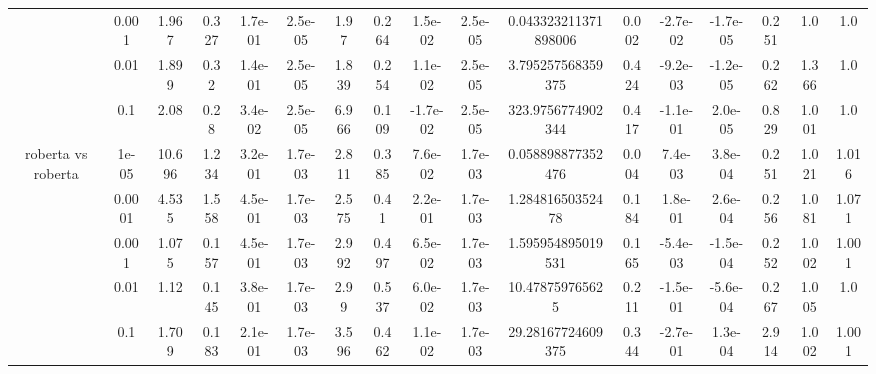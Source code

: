 \begin{tabular}{|c|c|c|c|c|c|c|c|c|c|c|c|c|c|c|c|c|}
 & 0.001 & 1.967 & 0.327 & 1.7e-01 & 2.5e-05 & 1.97 & 0.264 & 1.5e-02 & 2.5e-05 & 0.043323211371898006 & 0.002 & -2.7e-02 & -1.7e-05 & 0.251 & 1.0 & 1.0 \\
 & 0.01 & 1.899 & 0.32 & 1.4e-01 & 2.5e-05 & 1.839 & 0.254 & 1.1e-02 & 2.5e-05 & 3.795257568359375 & 0.424 & -9.2e-03 & -1.2e-05 & 0.262 & 1.366 & 1.0 \\
 & 0.1 & 2.08 & 0.28 & 3.4e-02 & 2.5e-05 & 6.966 & 0.109 & -1.7e-02 & 2.5e-05 & 323.9756774902344 & 0.417 & -1.1e-01 & 2.0e-05 & 0.829 & 1.001 & 1.0 \\
\hline
\multirow{5}{*}{roberta  vs roberta } & 1e-05 & 10.696 & 1.234 & 3.2e-01 & 1.7e-03 & 2.811 & 0.385 & 7.6e-02 & 1.7e-03 & 0.058898877352476 & 0.004 & 7.4e-03 & 3.8e-04 & 0.251 & 1.021 & 1.016 \\
 & 0.0001 & 4.535 & 1.558 & 4.5e-01 & 1.7e-03 & 2.575 & 0.41 & 2.2e-01 & 1.7e-03 & 1.28481650352478 & 0.184 & 1.8e-01 & 2.6e-04 & 0.256 & 1.081 & 1.071 \\
 & 0.001 & 1.075 & 0.157 & 4.5e-01 & 1.7e-03 & 2.992 & 0.497 & 6.5e-02 & 1.7e-03 & 1.595954895019531 & 0.165 & -5.4e-03 & -1.5e-04 & 0.252 & 1.002 & 1.001 \\
 & 0.01 & 1.12 & 0.145 & 3.8e-01 & 1.7e-03 & 2.99 & 0.537 & 6.0e-02 & 1.7e-03 & 10.478759765625 & 0.211 & -1.5e-01 & -5.6e-04 & 0.267 & 1.005 & 1.0 \\
 & 0.1 & 1.709 & 0.183 & 2.1e-01 & 1.7e-03 & 3.596 & 0.462 & 1.1e-02 & 1.7e-03 & 29.28167724609375 & 0.344 & -2.7e-01 & 1.3e-04 & 2.914 & 1.002 & 1.001 \\
\hline
\end{tabular}